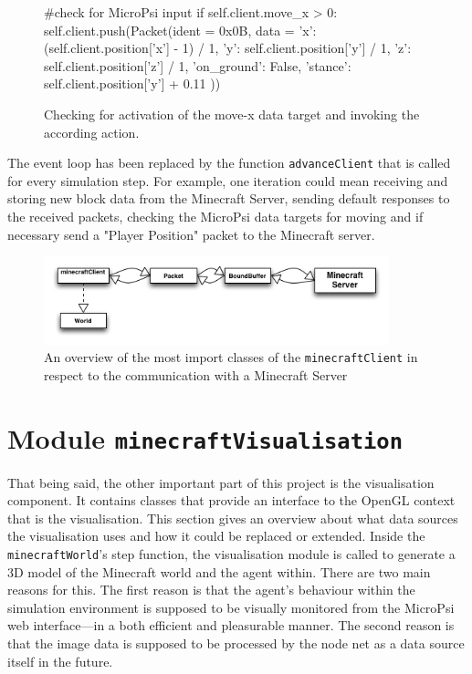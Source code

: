 		\begin{figure}[ht]
			\centering
			\begin{minipage}{11cm}
				\begin{pseudocode}
#check for MicroPsi input
if self.client.move_x > 0:
    self.client.push(Packet(ident = 0x0B, data = {
        'x': (self.client.position['x'] - 1) / 1,
        'y': self.client.position['y'] / 1,
        'z': self.client.position['z'] / 1,
        'on_ground': False,
        'stance': self.client.position['y'] + 0.11
        }))
					\end{pseudocode}
				\caption{Checking for activation of the move-x data target and invoking the according action.}
				\label{listing_dispatch}
			\end{minipage}
		\end{figure}

The event loop has been replaced by the function \texttt{advanceClient} that is called for every simulation step. For example, one iteration could mean receiving and storing new block data from the Minecraft Server, sending default responses to the received packets, checking the MicroPsi data targets for moving and if necessary send a "Player Position" packet to the Minecraft server.


\begin{figure}[h]
  \centering
    \includegraphics[width=10cm]{graphics/spock_overview}
  \caption{An overview of the most import classes of the \texttt{minecraftClient} in respect to the communication with a Minecraft Server}
  \label{spock_overview}
\end{figure}

    \section{Module \texttt{minecraftVisualisation}}

    
That being said, the other important part of this project is the visualisation component. It contains classes that provide an interface to the OpenGL context that is the visualisation. This section gives an overview about what data sources the visualisation uses and how it could be replaced or extended. Inside the \texttt{minecraftWorld}'s step function, the visualisation module is called to generate a 3D model of the Minecraft world and the agent within. There are two main reasons for this. The first reason is that the agent's behaviour within the simulation environment is supposed to be visually monitored from the MicroPsi web interface---in a both efficient and pleasurable manner. The second reason is that the image data is supposed to be processed by the node net as a data source itself in the future.

